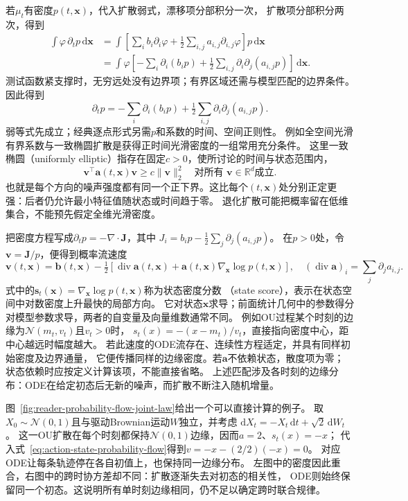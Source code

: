 若$\mu_t$有密度$p(t,\bm x)$，代入扩散弱式，漂移项分部积分一次，
扩散项分部积分两次，得到
\begin{align*}
 \int\varphi\,\partial_t p\,\mathrm d\bm x
  &=\int\left[\sum_i b_i\partial_i\varphi
            +\tfrac12\sum_{i,j}a_{i,j}\partial_{i,j}\varphi\right]p\,\mathrm d\bm x\\
  &=\int\varphi\left[-\sum_i\partial_i(b_ip)
           +\tfrac12\sum_{i,j}\partial_i\partial_j(a_{i,j}p)\right]\,\mathrm d\bm x .
\end{align*}
测试函数紧支撑时，无穷远处没有边界项；有界区域还需与模型匹配的边界条件。
因此得到
\begin{equation}
 \partial_t p=-\sum_i\partial_i(b_ip)
                  +\tfrac12\sum_{i,j}\partial_i\partial_j(a_{i,j}p).
 \label{eq:dynamical-fokker-planck}
\end{equation}
弱等式先成立；经典逐点形式另需$p$和系数的时间、空间正则性。
例如全空间光滑有界系数与一致椭圆扩散是获得正时间光滑密度的一组常用充分条件。
这里一致椭圆（uniformly elliptic）指存在固定$c>0$，使所讨论的时间与状态范围内，
\[
 \bm v^\top\bm a(t,\bm x)\bm v\geq c\|\bm v\|_2^2
 \quad\text{对所有 }\bm v\in\mathbb R^d\text{成立}.
\]
也就是每个方向的噪声强度都有同一个正下界。这比每个$(t,\bm x)$处分别正定更强：后者仍允许最小特征值随状态或时间趋于零。
退化扩散可能把概率留在低维集合，不能预先假定全维光滑密度。

把密度方程写成$\partial_t p=-\nabla\cdot\bm J$，其中
$J_i=b_ip-\frac12\sum_j\partial_j(a_{i,j}p)$。
在$p>0$处，令$\bm v=\bm J/p$，便得到概率流速度
\begin{equation}
 \bm v(t,\bm x)=\bm b(t,\bm x)
   -\tfrac12[\operatorname{div}\bm a(t,\bm x)
                         +\bm a(t,\bm x)\nabla_{\bm x}\log p(t,\bm x)],
 \quad
 (\operatorname{div}\bm a)_i=\sum_j\partial_j a_{i,j}.
 \label{eq:action-state-probability-flow}
\end{equation}
式中的$\bm s_t(\bm x)=\nabla_{\bm x}\log p(t,\bm x)$称为状态密度分数
（state score），表示在状态空间中对数密度上升最快的局部方向。
它对状态$\bm x$求导；前面统计几何中的参数得分对模型参数求导，两者的自变量及向量维数通常不同。
例如OU过程某个时刻的边缘为$\mathcal N(m_t,v_t)$且$v_t>0$时，
$s_t(x)=-(x-m_t)/v_t$，直接指向密度中心，距中心越远时幅度越大。
若此速度的ODE流存在、连续性方程适定，并具有同样初始密度及边界通量，
它便传播同样的边缘密度。若$\bm a$不依赖状态，散度项为零；
状态依赖时应按定义计算该项，不能直接省略。
上述匹配涉及各时刻的边缘分布：ODE在给定初态后无新的噪声，而扩散不断注入随机增量。

图~\ref{fig:reader-probability-flow-joint-law}给出一个可以直接计算的例子。
取$X_0\sim\mathcal N(0,1)$且与驱动Brownian运动$W$独立，并考虑
$\mathrm dX_t=-X_t\,\mathrm dt+\sqrt2\,\mathrm dW_t$。
这一OU扩散在每个时刻都保持$\mathcal N(0,1)$边缘，因而$a=2$、$s_t(x)=-x$；
代入式~\eqref{eq:action-state-probability-flow}得到$v=-x-(2/2)(-x)=0$。
对应ODE让每条轨迹停在各自初值上，也保持同一边缘分布。
左图中的密度因此重合，右图中的跨时协方差却不同：扩散逐渐失去对初态的相关性，
ODE则始终保留同一个初态。这说明所有单时刻边缘相同，仍不足以确定跨时联合规律。


